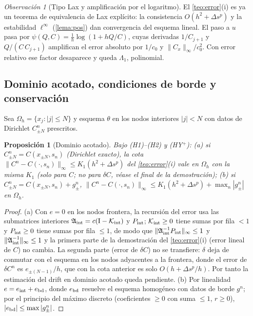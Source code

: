 \documentclass[11pt,letterpaper]{article}
\theoremstyle{plain}
\newtheorem{proposicion}[theorem]{Proposición}
\theoremstyle{definition}
\theoremstyle{remark}
\newtheorem{observacion}[theorem]{Observación}
\numberwithin{equation}{section}
\newcommand{\norm}[1]{\lVert #1\rVert}
\newcommand{\Id}{\mathrm{I}}
\begin{document}
	\begin{observacion}[Tipo Lax y amplificación por el logaritmo]
		El \cref{teo:error}(i) es ya un teorema de equivalencia de Lax explícito: la consistencia \(O(h^2+\Delta s^p)\) y la estabilidad \(\ell^\infty\) (\cref{lema:pos}) dan convergencia del esquema lineal. El paso a \(u\) pasa por \(\psi(Q,C)=\frac1h\log(1+hQ/C)\), cuyas derivadas \(1/C_{j+1}\) y \(Q/(C\,C_{j+1})\) amplifican el error absoluto por \(1/c_0\) y \(\|C_x\|_\infty/c_0^2\). Con error relativo ese factor desaparece y queda \(\Lambda_1\), polinomial.
	\end{observacion}
	
	\subsection{Dominio acotado, condiciones de borde y conservación}\label{subsec:borde}
	
	Sea \(\Omega_h=\{x_j:|j|\le N\}\) y esquema \(\theta\) en los nodos interiores \(|j|<N\) con datos de Dirichlet \(C^n_{\pm N}\) prescritos.
	
	\begin{proposicion}[Dominio acotado]\label{prop:borde}
		Bajo (H1)--(H2) y (HY\(^+\)): (a) si \(C^n_{\pm N}=C(x_{\pm N},s_n)\) (Dirichlet exacto), la cota \(\norm{C^n-C(\cdot,s_n)}_\infty\le K_1(h^2+\Delta s^p)\) del \cref{teo:error}(i) vale en \(\Omega_h\) con la misma \(K_1\) (solo para \(C\); no para \(\delta C\), véase el final de la demostración); (b) si \(C^n_{\pm N}=C(x_{\pm N},s_n)+g^n_\pm\), \(\norm{C^n-C(\cdot,s_n)}_\infty\le K_1(h^2+\Delta s^p)+\max_n|g^n_\pm|\) en \(\Omega_h\).
	\end{proposicion}
	
	\begin{proof}
		(a) Con \(e=0\) en los nodos frontera, la recursión del error usa las submatrices interiores \(\mathfrak A_{\rm int}=c(\Id-\mathcal K_{\rm int})\) y \(P_{\rm int}\); \(\mathcal K_{\rm int}\ge0\) tiene sumas por fila \(<1\) y \(P_{\rm int}\ge0\) tiene sumas por fila \(\le1\), de modo que \(\|\mathfrak A_{\rm int}^{-1}P_{\rm int}\|_\infty\le1\) y \(\|\mathfrak A_{\rm int}^{-1}\|_\infty\le1\) y la primera parte de la demostración del \cref{teo:error}(i) (error lineal de \(C\)) no cambia. La segunda parte (error de \(\delta C\)) no se transfiere: \(\delta\) deja de conmutar con el esquema en los nodos adyacentes a la frontera, donde el error de \(\delta C^n\) es \(e_{\pm(N-1)}/h\), que con la cota anterior es solo \(O(h+\Delta s^p/h)\). Por tanto la estimación del drift en dominio acotado queda pendiente. (b) Por linealidad \(e=e_{\rm int}+e_{\rm bd}\), donde \(e_{\rm bd}\) resuelve el esquema homogéneo con datos de borde \(g^n\); por el principio del máximo discreto (coeficientes \(\ge0\) con suma \(\le1\), \(r\ge0\)), \(|e_{\rm bd}|\le\max|g^n_\pm|\).
	\end{proof}
	
\end{document}
